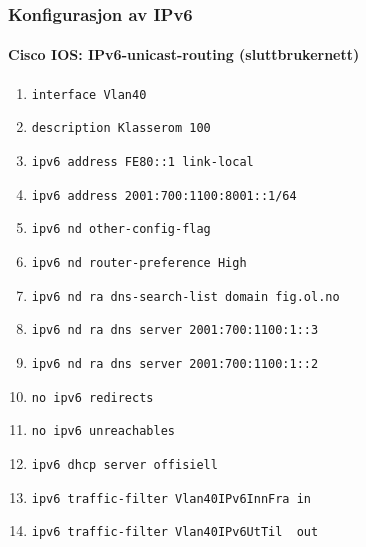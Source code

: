 \begin{frame}
  \frametitle{Konfigurasjon av IPv6}
  \framesubtitle{Cisco IOS: IPv6-unicast-routing (sluttbrukernett)}
  \begin{enumerate}
  \item \alert{\texttt{interface Vlan40}}
  \item \texttt{description Klasserom 100}
  \item \alert{\texttt{ipv6 address FE80::1 link-local}}
  \item \alert{\texttt{ipv6 address 2001:700:1100:8001::1/64}}
  \item \alert{\texttt{ipv6 nd other-config-flag}}
  \item \alert{\texttt{ipv6 nd router-preference High}}
  \item \alert{\texttt{ipv6 nd ra dns-search-list domain fig.ol.no}}
  \item \alert{\texttt{ipv6 nd ra dns server 2001:700:1100:1::3}}
  \item \alert{\texttt{ipv6 nd ra dns server 2001:700:1100:1::2}}
  \item \alert{\texttt{no ipv6 redirects}}
  \item \alert{\texttt{no ipv6 unreachables}}
  \item \alert{\texttt{ipv6 dhcp server offisiell}}
  \item \alert{\texttt{ipv6 traffic-filter Vlan40IPv6InnFra in}}
  \item \alert{\texttt{ipv6 traffic-filter Vlan40IPv6UtTil\ \ out}}
  \end{enumerate}
\end{frame}

